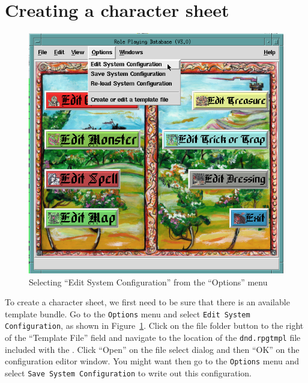 \section{Creating a character sheet}

\begin{figure}[hbpt]
\begin{centering}
\includegraphics[width=5in]{OpenConfigurationEditor.png}
\caption{Selecting ``Edit System Configuration'' from the ``Options'' menu}
\label{fig:opensysconfedit}
\end{centering}
\end{figure}
To create a character sheet, we first need to be sure that there is an
available template bundle.  Go to the \verb=Options= menu and select
\verb=Edit System Configuration=, as shown in
Figure~\ref{fig:opensysconfedit}. Click on the file folder button to the
right of the ``Template File'' field and navigate to the location of the
\verb=dnd.rpgtmpl= file included with the \thesystem. Click ``Open'' on
the file select dialog and then ``OK'' on the configuration editor
window.  You might want then go to the \verb=Options= menu and select
\verb=Save System Configuration= to write out this configuration.

